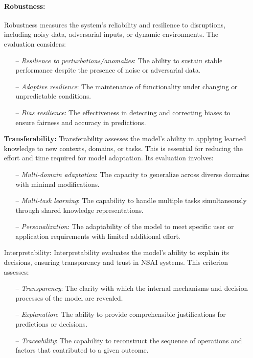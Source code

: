 \documentclass[12pt]{article}
\begin{document}
\paragraph{Robustness:}
Robustness measures the system’s reliability and resilience to disruptions, including noisy data, adversarial inputs, or dynamic environments. The evaluation considers:

\begin{itemize}
    \item[--] \textit{Resilience to perturbations/anomalies}: The ability to sustain stable performance despite the presence of noise or adversarial data.
    \item[--] \textit{Adaptive resilience}: The maintenance of functionality under changing or unpredictable conditions.
    \item[--] \textit{Bias resilience}: The effectiveness in detecting and correcting biases to ensure fairness and accuracy in predictions.
\end{itemize}

\noindent \textbf{Transferability:}
Transferability assesses the model’s ability in applying learned knowledge to new contexts, domains, or tasks. This is essential for reducing the effort and time required for model adaptation. Its evaluation involves:

\begin{itemize}
    \item[--] \textit{Multi-domain adaptation}: The capacity to generalize across diverse domains with minimal modifications.
    \item[--] \textit{Multi-task learning}: The capability to handle multiple tasks simultaneously through shared knowledge representations.
    \item[--] \textit{Personalization}: The adaptability of the model to meet specific user or application requirements with limited additional effort.
\end{itemize}

\noindent \textbf{}{Interpretability:}
Interpretability evaluates the model’s ability to explain its decisions, ensuring transparency and trust in NSAI systems. This criterion assesses:

\begin{itemize}
    \item[--] \textit{Transparency}: The clarity with which the internal mechanisms and decision processes of the model are revealed.
    \item[--] \textit{Explanation}: The ability to provide comprehensible justifications for predictions or decisions.
    \item[--] \textit{Traceability}: The capability to reconstruct the sequence of operations and factors that contributed to a given outcome.
\end{itemize}
\end{document}
